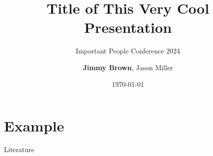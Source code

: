 \documentclass[8pt, handout, aspectratio = 1510]{beamer}
\title{Title of This Very Cool Presentation}
\subtitle{Important People Conference 2024}
\author{\textbf{Jimmy Brown}, Jason Miller}
\institute{Fancy University Somewhere, FUS\\ Institute for Computational Mechanics}
\date{\today}
\begin{document}
	\begin{frame}[plain]
		\maketitle
	\end{frame}

	\section{Example}
  

  \begin{frame}[allowframebreaks]{Literature}
    \nocite{*}
    
    
  \end{frame}
\end{document}
